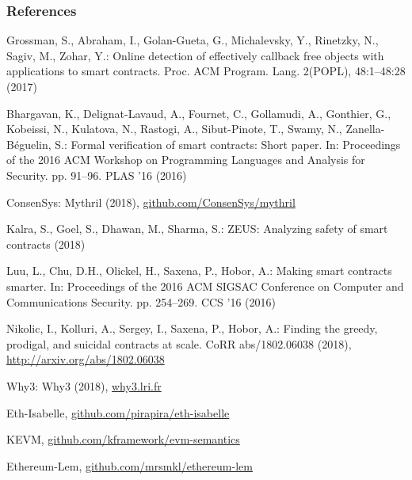 \documentclass{beamer}
\begin{document}
\begin{frame}[allowframebreaks]
  \frametitle<presentation>{References}
    
  \begin{thebibliography}{20}
    

Grossman, S., Abraham, I., Golan-Gueta, G., Michalevsky, Y., Rinetzky, N.,
  Sagiv, M., Zohar, Y.: Online detection of effectively callback free objects
  with applications to smart contracts. Proc. ACM Program. Lang.  2(POPL),
  48:1--48:28 (2017)

Bhargavan, K., Delignat-Lavaud, A., Fournet, C., Gollamudi, A., Gonthier, G.,
  Kobeissi, N., Kulatova, N., Rastogi, A., Sibut-Pinote, T., Swamy, N.,
  Zanella-B{\'e}guelin, S.: Formal verification of smart contracts: Short
  paper. In: Proceedings of the 2016 ACM Workshop on Programming Languages and
  Analysis for Security. pp. 91--96. PLAS '16 (2016)

ConsenSys: Mythril (2018), \url{github.com/ConsenSys/mythril}

Kalra, S., Goel, S., Dhawan, M., Sharma, S.: {ZEUS}: Analyzing safety of smart
  contracts  (2018)

Luu, L., Chu, D.H., Olickel, H., Saxena, P., Hobor, A.: Making smart contracts
  smarter. In: Proceedings of the 2016 ACM SIGSAC Conference on Computer and
  Communications Security. pp. 254--269. CCS '16 (2016)

Nikolic, I., Kolluri, A., Sergey, I., Saxena, P., Hobor, A.: Finding the
  greedy, prodigal, and suicidal contracts at scale. CoRR  abs/1802.06038
  (2018), \url{http://arxiv.org/abs/1802.06038}

Why3: Why3 (2018), \url{why3.lri.fr}

Eth-Isabelle, \url{github.com/pirapira/eth-isabelle}

KEVM, \url{github.com/kframework/evm-semantics}

Ethereum-Lem, \url{github.com/mrsmkl/ethereum-lem}

  \end{thebibliography}
\end{frame}
\end{document}
